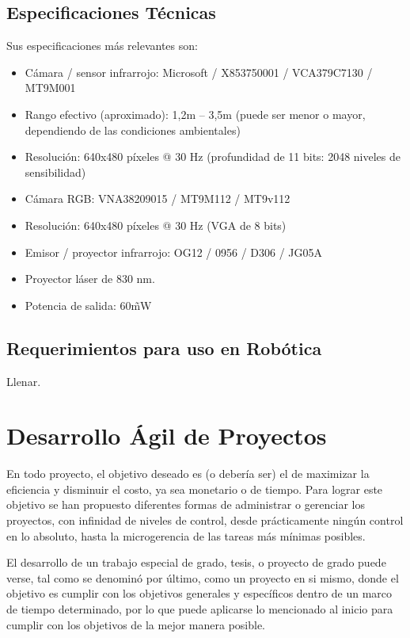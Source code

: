 \subsection{Especificaciones Técnicas}
Sus especificaciones más relevantes son:

\begin{itemize}
	\itemsep1pt \parskip1pt 
	\item Cámara / sensor infrarrojo: Microsoft / X853750001 / VCA379C7130 / MT9M001
	\item Rango efectivo (aproximado): 1,2m – 3,5m (puede ser menor o mayor, dependiendo de las condiciones ambientales)
	\item Resolución: 640x480 píxeles @ 30 Hz (profundidad de 11 bits: 2048 niveles de sensibilidad)
	\item Cámara RGB: VNA38209015 / MT9M112 / MT9v112
	\item Resolución: 640x480 píxeles @ 30 Hz (VGA de 8 bits)
	\item Emisor / proyector infrarrojo: OG12 / 0956 / D306 / JG05A
	\item Proyector láser de 830 nm.
	\item Potencia de salida: 60\~ mW
\end{itemize}

\subsection{Requerimientos para uso en Robótica}

Llenar.

\section{Desarrollo Ágil de Proyectos}

En todo proyecto, el objetivo deseado es (o debería ser) el de maximizar la eficiencia y disminuir el costo, ya sea monetario o de tiempo. Para lograr este objetivo se han propuesto diferentes formas de administrar o gerenciar los proyectos, con infinidad de niveles de control, desde prácticamente ningún control en lo absoluto, hasta la microgerencia de las tareas más mínimas posibles.

El desarrollo de un trabajo especial de grado, tesis, o proyecto de grado puede verse, tal como se denominó por último, como un proyecto en si mismo, donde el objetivo es cumplir con los objetivos generales y específicos dentro de un marco de tiempo determinado, por lo que puede aplicarse lo mencionado al inicio para cumplir con los objetivos de la mejor manera posible.

